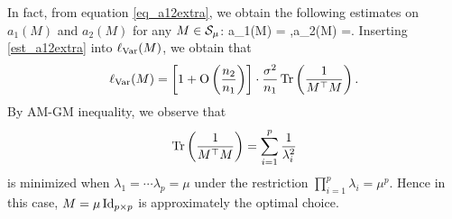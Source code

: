 %
In fact, from equation \eqref{eq_a12extra}, we obtain the following estimates on $ a_1(M)$ and $a_2(M)$ for any $M\in \cal S_\mu$:
\be\label{est_a12extra}
 a_1(M) = ,\quad a_2(M) =.
\ee
Inserting \eqref{est_a12extra} into $\ell_{\var}(M)$, we obtain that
$$\ell_{\var}(M)= \left[ 1+\OO\left(\frac{n_2}{n_1}\right)\right] \cdot \frac{\sigma^2}{n_1} \tr\left( \frac{1}{M^\top M}\right) .$$
%
By AM-GM inequality, we observe that
$$\tr\left( \frac{1}{M^\top M}\right) = \sum_{i=1}^p\frac{1}{\lambda_i^2}$$
is minimized when $\lambda_1 = \cdots\lambda_p=\mu$ under the restriction $\prod_{i=1}^p\lambda_i =\mu^p$. Hence in this case, $M=\mu \id_{p\times p}$ is approximately the optimal choice.

